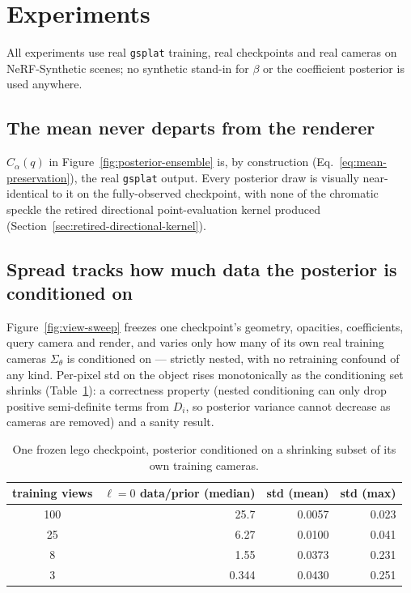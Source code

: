 \documentclass[letterpaper,10pt,conference]{ieeeconf}
\begin{document}
\section{Experiments}
\label{sec:experiments}

All experiments use real \texttt{gsplat} training, real checkpoints and
real cameras on NeRF-Synthetic scenes; no synthetic stand-in for $\beta$ or
the coefficient posterior is used anywhere.

\subsection{The mean never departs from the renderer}

$C_\alpha(q)$ in Figure~\ref{fig:posterior-ensemble} is, by construction
(Eq.~\eqref{eq:mean-preservation}), the real \texttt{gsplat} output. Every
posterior draw is visually near-identical to it on the fully-observed
checkpoint, with none of the chromatic speckle the retired directional
point-evaluation kernel produced (Section~\ref{sec:retired-directional-kernel}).

\subsection{Spread tracks how much data the posterior is conditioned on}

Figure~\ref{fig:view-sweep} freezes one checkpoint's geometry, opacities,
coefficients, query camera and render, and varies only how many of its own
real training cameras $\Sigma_\theta$ is conditioned on --- strictly
nested, with no retraining confound of any kind. Per-pixel std on the
object rises monotonically as the conditioning set shrinks
(Table~\ref{tab:view-sweep}): a correctness property (nested conditioning
can only drop positive semi-definite terms from $D_i$, so posterior
variance cannot decrease as cameras are removed) and a sanity result.

\begin{table}[t]
    \centering
    \caption{One frozen lego checkpoint, posterior conditioned on a
    shrinking subset of its own training cameras.}
    \label{tab:view-sweep}
    \begin{tabular}{@{}crrr@{}}
        \toprule
        training views & $\ell{=}0$ data/prior (median) & std (mean) & std (max) \\
        \midrule
        100 & 25.7  & 0.0057 & 0.023 \\
        25  & 6.27  & 0.0100 & 0.041 \\
        8   & 1.55  & 0.0373 & 0.231 \\
        3   & 0.344 & 0.0430 & 0.251 \\
        \bottomrule
    \end{tabular}
\end{table}
\end{document}
